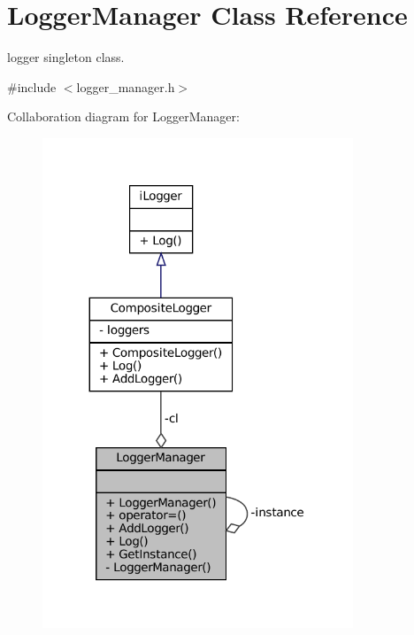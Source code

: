 \hypertarget{classLoggerManager}{}\section{Logger\+Manager Class Reference}
\label{classLoggerManager}


logger singleton class.  




{\ttfamily \#include $<$logger\+\_\+manager.\+h$>$}



Collaboration diagram for Logger\+Manager\+:\nopagebreak
\begin{figure}[H]
\begin{center}
\leavevmode
\includegraphics[width=263pt]{classLoggerManager__coll__graph}
\end{center}
\end{figure}
